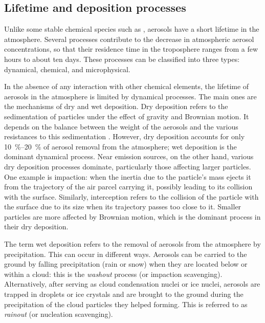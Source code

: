 

    \subsection{Lifetime and deposition processes}
    \label{sec:deposition_processes}

    Unlike some stable chemical species such as , aerosols have a short lifetime in the atmosphere. Several processes contribute to the decrease in atmospheric aerosol concentrations, so that their residence time in the troposphere ranges from a few hours to about ten days. These processes can be classified into three types: dynamical, chemical, and microphysical.
    
    In the absence of any interaction with other chemical elements, the lifetime of aerosols in the atmosphere is limited by dynamical processes. The main ones are the mechanisms of dry and wet deposition. 
    Dry deposition refers to the sedimentation of particles under the effect of gravity and Brownian motion. It depends on the balance between the weight of the aerosols and the various resistances to this sedimentation \citep{farmer_dry_2021}.
    However, dry deposition accounts for only \SIrange{10}{20}{\percent} of aerosol removal from the atmosphere; wet deposition is the dominant dynamical process. Near emission sources, on the other hand, various dry deposition processes dominate, particularly those affecting larger particles. One example is impaction: when the inertia due to the particle's mass ejects it from the trajectory of the air parcel carrying it, possibly leading to its collision with the surface. Similarly, interception refers to the collision of the particle with the surface due to its size when its trajectory passes too close to it. Smaller particles are more affected by Brownian motion, which is the dominant process in their dry deposition.
    
    The term wet deposition refers to the removal of aerosols from the atmosphere by precipitation. This can occur in different ways. Aerosols can be carried to the ground by falling precipitation (rain or snow) when they are located below or within a cloud: this is the \emph{washout} process (or impaction scavenging). Alternatively, after serving as cloud condensation nuclei or ice nuclei, aerosols are trapped in droplets or ice crystals and are brought to the ground during the precipitation of the cloud particles they helped forming. This is referred to as \emph{rainout} (or nucleation scavenging).
    

